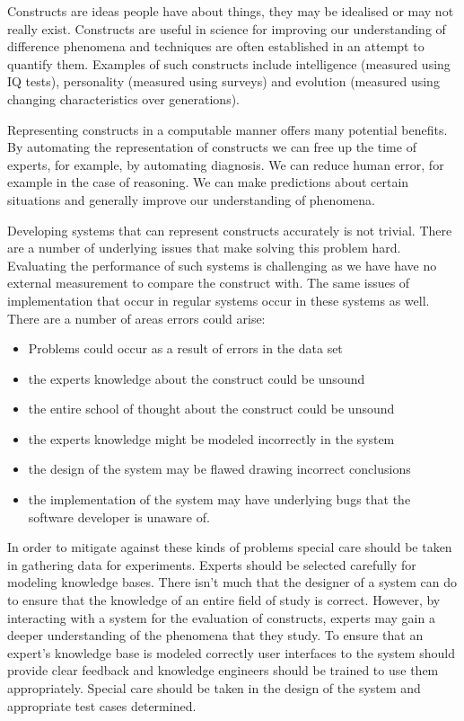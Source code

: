 Constructs are ideas people have about things, they may be idealised or may not really exist. Constructs are useful in science for improving our understanding of difference phenomena and techniques are often established in an attempt to quantify them. Examples of such constructs include intelligence (measured using IQ tests), personality (measured using surveys) and evolution (measured using changing characteristics over generations).

Representing constructs in a computable manner offers many potential benefits. By automating the representation of constructs we can free up the time of experts, for example, by automating diagnosis. We can reduce human error, for example in the case of reasoning. We can make predictions about certain situations and generally improve our understanding of phenomena. 

Developing systems that can represent constructs accurately is not trivial. There are a number of underlying issues that make solving this problem hard. Evaluating the performance of such systems is challenging as we have have no external measurement to compare the construct with. The same issues of implementation that occur in regular systems occur in these systems as well. There are a number of areas errors could arise:

\begin{itemize}

  \item Problems could occur as a result of errors in the data set
  \item the experts knowledge about the construct could be unsound
  \item the entire school of thought about the construct could be unsound
  \item the experts knowledge might be modeled incorrectly in the system
  \item the design of the system may be flawed drawing incorrect conclusions
  \item the implementation of the system may have underlying bugs that the software developer is unaware of.
  
\end{itemize}

In order to mitigate against these kinds of problems special care should be taken in gathering data for experiments. Experts should be selected carefully for modeling knowledge bases. There isn't much that the designer of a system can do to ensure that the knowledge of an entire field of study is correct. However, by interacting with a system for the evaluation of constructs, experts may gain a deeper understanding of the phenomena that they study. To ensure that an expert's knowledge base is modeled correctly user interfaces to the system should provide clear feedback and knowledge engineers should be trained to use them appropriately. Special care should be taken in the design of the system and appropriate test cases determined.

